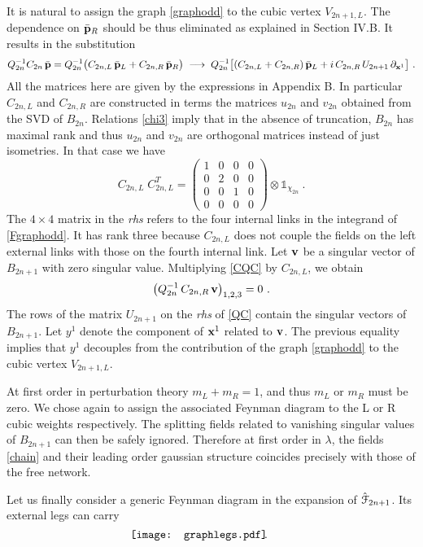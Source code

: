 \documentclass[a4paper,preprintnumbers,nofootinbib,twocolumn]{quantumarticle}
\newcommand{\be}{\begin{equation}} \newcommand{\ee}{\end{equation}}
\newcommand{\id}{\mathds 1}
\begin{document}
It is natural to assign the graph \eqref{graphodd} to the cubic vertex $V_{2n+1,L}$. The dependence on ${\bar {\bf p}}_R$ should be thus eliminated as explained in Section IV.B. It results in
the substitution
\be
Q^{-1}_{2n} C_{2n} \,{\bar {\bf p}} = Q^{-1}_{2n} \big( C_{2n,L}\, {\bar {\bf p}}_L + C_{2n,R}\, {\bar {\bf p}}_R \big)\;  \longrightarrow \; 
Q^{-1}_{2n} \big[ (C_{2n,L}+C_{2n,R}) \, {\bar {\bf p}}_L +i \,C_{2n,R} \, U_{2n+1} \, \partial_{{\bf x}^1} \big] \ .
\label{QC}
\ee
All the matrices here are given by the expressions in Appendix B. 
In particular $C_{2n,L}$ and $C_{2n,R}$ are constructed in terms the matrices $u_{2n}$ and $v_{2n}$ obtained from the SVD of $B_{2n}$. Relations \eqref{chi3} imply that 
in the absence of truncation, $B_{2n}$ has maximal rank and thus $u_{2n}$ and $v_{2n}$ are orthogonal matrices instead of just isometries. In that case we have
\be
C_{2n,L} \; C_{2n,L}^T =  
\begin{pmatrix}
1 & 0 & 0 & 0 \\
0 & 2 & 0 & 0 \\
0 & 0 & 1 & 0 \\
0 & 0 & 0 & 0 
\end{pmatrix} 
\otimes \id_{\chi_{2n}} \ .
\ee 
The $4 \times 4$ matrix in the {\it rhs} refers to the four internal links in the integrand of \eqref{Fgraphodd}. It has rank three because $C_{2n,L}$ does not couple the fields on the left external links with those on the fourth internal link. Let ${\bf v}$ be a singular vector of $B_{2n+1}$ with zero singular value. Multiplying \eqref{CQC} by $C_{2n,L}$, we obtain
\be
\big( Q_{2n}^{-1} \, C_{2n,R} \, {\bf v} \big)_{1,2,3} =0  \ .
\ee
The rows of the matrix $U_{2n+1}$ on the {\it rhs} of \eqref{QC} contain the singular vectors of $B_{2n+1}$. Let $y^{1}$ denote the component of ${\bf x}^1$ related to ${\bf v}$. The previous equality implies that $y^{1}$ decouples from the contribution of the graph \eqref{graphodd} to the cubic vertex $V_{2n+1,L}$. 

At first order in perturbation theory $m_L +m_R =1$, and thus $m_L$ or $m_R$ must be zero. We chose again to assign the associated Feynman diagram to the L or R cubic weights respectively.
The splitting fields related to vanishing singular values of $B_{2n+1}$ 
can then be safely ignored. Therefore at first order in $\lambda$, the fields \eqref{chain} and their leading order gaussian structure coincides precisely with those of the free network.

Let us finally consider  a generic Feynman diagram in the expansion of ${\hat {\cal F}}_{2n+1}$. Its external legs can carry
\vspace*{-3.4cm}
\begin{equation}
\hspace{-0mm} \vcenter{ \hbox{\hspace{-9mm} \texttt{[image: graphlegs.pdf]}}} \hspace{-2mm}  \ .
\label{graphgen}
\end{equation}
\vspace*{-3.5cm}
\end{document}

